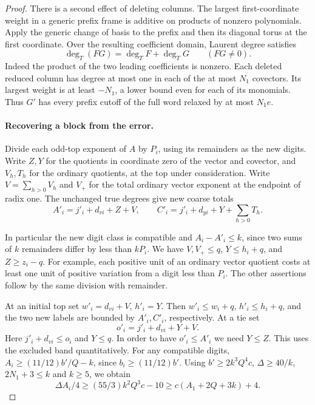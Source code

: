 \begin{proof}
There is a second effect of deleting columns. The largest
first-coordinate weight in a generic prefix frame is additive on
products of nonzero polynomials. Apply the generic change of
basis to the prefix and then its diagonal torus at the first
coordinate. Over the resulting coefficient domain, Laurent degree satisfies
\[
 \deg_T(FG)=\deg_T F+\deg_T G\qquad(FG\ne0).
\]
Indeed the product of the two leading coefficients is nonzero. Each deleted reduced column
has degree at most one in each of the at most \(N_1\) covectors.
Its largest weight is at least \(-N_1\), a lower bound even
for each of its monomials. Thus \(G'\) has every prefix cutoff
of the full word relaxed by at most \(N_1 e\).

\paragraph{Recovering a block from the error.}
Divide each odd-top exponent of \(A\) by \(P_i\), using its
remainders as the new digits. Write \(Z,Y\) for the quotients
in coordinate zero of the vector and covector, and
\(V_h,T_h\) for the ordinary quotients, at the top under
consideration. Write \(V=\sum_{h>0}V_h\) and \(V_+\)
for the total ordinary vector exponent at the endpoint of
radix one. The unchanged true degrees give new coarse totals
\[
 A'_i=j'_i+d_{vi}+Z+V,\qquad
 C'_i=j'_i+d_{yi}+Y+\sum_{h>0}T_h .
\]

In particular the new digit class is compatible and
\(A_i-A'_i\le k\), since two sums of \(k\) remainders
differ by less than \(kP_i\). We have \(V,V_+\le q\),
\(Y\le h_i+q\), and \(Z\ge z_i-q\). For example, each
positive unit of an ordinary vector quotient costs at least
one unit of positive variation from a digit less than \(P_i\).
The other assertions follow by the same division with remainder.

At an initial top set \(w'_i=d_{vi}+V\), \(h'_i=Y\).
Then \(w'_i\le w_i+q\), \(h'_i\le h_i+q\), and the two
new labels are bounded by \(A'_i,C'_i\), respectively. At a
tie set
\[
              o'_i=j'_i+d_{vi}+Y+V .
\]
Here \(j'_i+d_{vi}\le o_i\) and \(Y\le q\). In order to
have \(o'_i\le A'_i\) we need \(Y\le Z\). This uses the
excluded band quantitatively. For any compatible digits,
\(A_i\ge(11/12)b'/Q-k\), since \(b_i\ge(11/12)b'\).
Using \(b'\ge2k^3Q^4c\), \(\Delta\ge40/k\),
\(2N_1+3\le k\) and \(k\ge5\), we obtain
\[
 \Delta A_i/4\ge (55/3) k^2 Q^3 c-10
              \ge c(A_1+2Q+3k)+4 .
\]


\end{proof}
